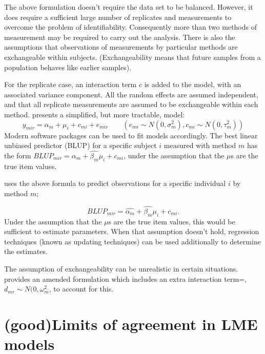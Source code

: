 \documentclass[12pt, a4paper]{report}
\theoremstyle{plain}
\theoremstyle{definition}
\theoremstyle{remark}
\begin{document}
The above formulation doesn't require the data set to be balanced.
However, it does require a sufficient large number of replicates
and measurements to overcome the problem of identifiability. Consequently more than two methods of measurement may
be required to carry out the analysis. There is also the
assumptions that observations of measurements by particular
methods are exchangeable within subjects. (Exchangeability means
that future samples from a population behaves like earlier
samples).

For the
replicate case, an interaction term $c$ is added to the model,
with an associated variance component. All the random effects are
assumed independent, and that all replicate measurements are
assumed to be exchangeable within each method. \citet{BXC2008} presents a simplified, but more tractable, model:
\begin{equation}
y_{mir}  = \alpha_{m} + \mu_{i} + c_{mi} + e_{mir} \qquad ( e_{mi}
\sim N(0,\sigma^{2}_{m}), c_{mi} \sim N(0,\tau^{2}_{m}))
\end{equation}
Modern software packages can be used to fit models accordingly. The best linear
unbiased predictor (BLUP) for a specific subject $i$ measured with
method $m$ has the form $BLUP_{mir} = \hat{\alpha_{m}} +
\hat{\beta_{m}}\mu_{i} + c_{mi}$, under the assumption that the
$\mu$s are the true item values.



\citet{BXC2004} uses the above formula to predict observations for
a specific individual $i$ by method $m$;

\begin{equation}BLUP_{mir} = \hat{\alpha_{m}} + \hat{\beta_{m}}\mu_{i} +
c_{mi}. \end{equation} Under the assumption that the $\mu$s are
the true item values, this would be sufficient to estimate
parameters. When that assumption doesn't hold, regression
techniques (known as updating techniques) can be used additionally
to determine the estimates. 

The assumption of exchangeability can
be unrealistic in certain situations. \citet{BXC2004} provides an
amended formulation which includes an extra interaction term=, $
d_{mr} \sim N(0,\omega^{2}_{m}$, to account for this.



\section{ (good)Limits of agreement in LME models}
\end{document}
